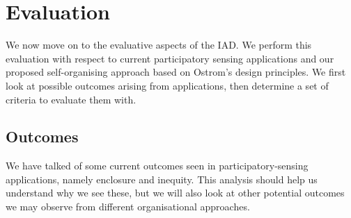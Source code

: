 \section{Evaluation}

We now move on to the evaluative aspects of the \ac{IAD}. We perform this evaluation with respect to current participatory sensing applications and our proposed self-organising approach based on Ostrom's design principles. We first look at possible outcomes arising from applications, then determine a set of criteria to evaluate them with.

\subsection{Outcomes}

We have talked of some current outcomes seen in participatory-sensing applications, namely enclosure and inequity. 
This analysis should help us understand why we see these, but we will also look at other potential outcomes we may observe from different organisational approaches. 

